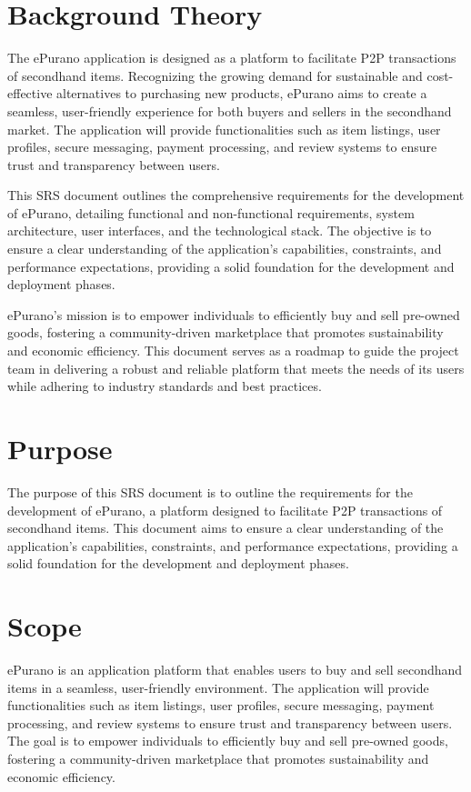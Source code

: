 \section{Background Theory}

The ePurano application is designed as a platform to facilitate P2P transactions of secondhand items. Recognizing the growing demand for sustainable and cost-effective alternatives to purchasing new products, ePurano aims to create a seamless, user-friendly experience for both buyers and sellers in the secondhand market. The application will provide functionalities such as item listings, user profiles, secure messaging, payment processing, and review systems to ensure trust and transparency between users.

This SRS document outlines the comprehensive requirements for the development of ePurano, detailing functional and non-functional requirements, system architecture, user interfaces, and the technological stack. The objective is to ensure a clear understanding of the application's capabilities, constraints, and performance expectations, providing a solid foundation for the development and deployment phases.

ePurano's mission is to empower individuals to efficiently buy and sell pre-owned goods, fostering a community-driven marketplace that promotes sustainability and economic efficiency. This document serves as a roadmap to guide the project team in delivering a robust and reliable platform that meets the needs of its users while adhering to industry standards and best practices.

\section{Purpose}

The purpose of this SRS document is to outline the requirements for the development of ePurano, a platform designed to facilitate P2P transactions of secondhand items. This document aims to ensure a clear understanding of the application's capabilities, constraints, and performance expectations, providing a solid foundation for the development and deployment phases.

\section{Scope}

ePurano is an application platform that enables users to buy and sell secondhand items in a seamless, user-friendly environment. The application will provide functionalities such as item listings, user profiles, secure messaging, payment processing, and review systems to ensure trust and transparency between users. The goal is to empower individuals to efficiently buy and sell pre-owned goods, fostering a community-driven marketplace that promotes sustainability and economic efficiency.

